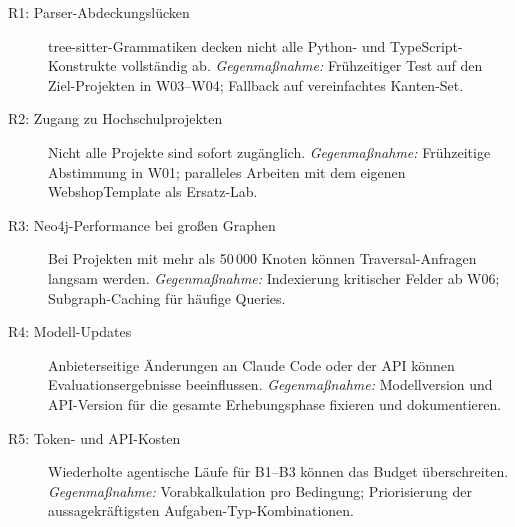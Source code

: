 \begin{description}
  \item[R1: Parser-Abdeckungslücken] tree-sitter-Grammatiken decken nicht alle Python- und TypeScript-Konstrukte vollständig ab. \emph{Gegenmaßnahme:} Frühzeitiger Test auf den Ziel-Projekten in W03--W04; Fallback auf vereinfachtes Kanten-Set.

  \item[R2: Zugang zu Hochschulprojekten] Nicht alle Projekte sind sofort zugänglich. \emph{Gegenmaßnahme:} Frühzeitige Abstimmung in W01; paralleles Arbeiten mit dem eigenen WebshopTemplate als Ersatz-Lab.

  \item[R3: Neo4j-Performance bei großen Graphen] Bei Projekten mit mehr als 50\,000 Knoten können Traversal-Anfragen langsam werden. \emph{Gegenmaßnahme:} Indexierung kritischer Felder ab W06; Subgraph-Caching für häufige Queries.

  \item[R4: Modell-Updates] Anbieterseitige Änderungen an Claude Code oder der API können Evaluationsergebnisse beeinflussen. \emph{Gegenmaßnahme:} Modellversion und API-Version für die gesamte Erhebungsphase fixieren und dokumentieren.

  \item[R5: Token- und API-Kosten] Wiederholte agentische Läufe für B1--B3 können das Budget überschreiten. \emph{Gegenmaßnahme:} Vorabkalkulation pro Bedingung; Priorisierung der aussagekräftigsten Aufgaben-Typ-Kombinationen.
\end{description}
